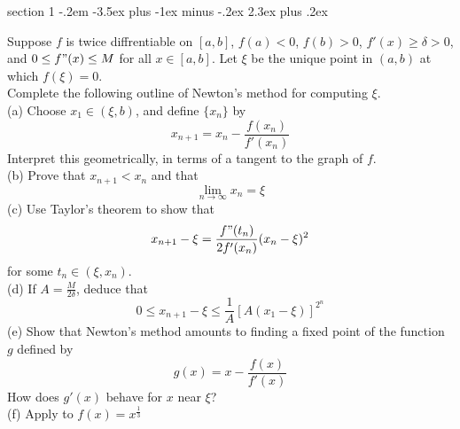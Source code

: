 \documentclass[12pt]{article}
\makeatletter
\newenvironment{problem}{\@startsection
       {section}
       {1}
       {-.2em}
       {-3.5ex plus -1ex minus -.2ex}
       {2.3ex plus .2ex}
       {\pagebreak[3]%
       \large\bf\noindent{P }
       }
       }
\makeatother
\begin{document}
\begin{problem}{25}
    Suppose $f$ is twice diffrentiable on $[a,b]$, $f(a)<0$, $f(b)>0$, $f'(x)\ge \delta > 0$, and $0 \le f"(x) \le M$ for all $x \in [a,b]$.
    Let $\xi$ be the unique point in $(a,b)$ at which $f(\xi)=0$.\\
    Complete the following outline of Newton's method for computing $\xi$.\\
    (a) Choose $x_1\in(\xi,b)$, and define $\{x_n\}$ by
    $$x_{n+1}=x_n -\frac{f(x_n)}{f'(x_n)}$$
    Interpret this geometrically, in terms of a tangent to the graph of $f$. \\
    (b) Prove that $x_{n+1} < x_n$ and that 
    $$\lim_{n\to\infty} x_n = \xi$$
    (c) Use Taylor's theorem to show that 
    $$x_{n+1}-\xi=\frac{f"(t_n)}{2f'(x_n)}(x_n-\xi)^2$$
    for some $t_n \in (\xi,x_n)$.\\
    (d) If $A= \frac{M}{2\delta}$, deduce that
    $$0 \le x_{n+1} - \xi \le \frac{1}{A}[A(x_1-\xi)]^{2^n}$$
    (e) Show that Newton's method amounts to finding a fixed point of the function $g$ defined by
    $$g(x)=x-\frac{f(x)}{f'(x)}$$
    How does $g'(x)$ behave for $x$ near $\xi$?\\
    (f) Apply to $f(x)=x^\frac{1}{3}$
\end{problem}
\end{document}
